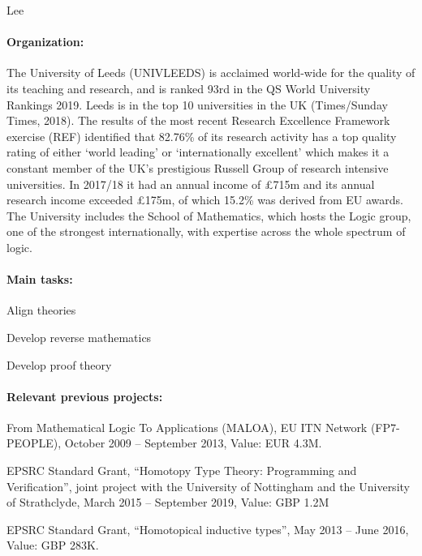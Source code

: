 \begin{sitedescription}{Lee}

\paragraph{Organization:} The University of Leeds (UNIVLEEDS) is acclaimed world-wide for the quality of its teaching and research, and is ranked 93rd in the QS World University Rankings 2019. Leeds is in the top 10 universities in the UK (Times/Sunday Times, 2018). The results of the most recent Research Excellence Framework exercise (REF) identified that 82.76\% 
of its research activity has a top quality rating of either `world leading' or `internationally excellent' which makes it a constant member of the UK's prestigious Russell Group of research intensive universities. 
In 2017/18 it had an annual income of \pounds 715m and its annual research income exceeded \pounds 175m, of which 15.2\% was derived from EU awards. The University includes the School of Mathematics,
which hosts the Logic group, one of the strongest internationally, with expertise across the whole
spectrum of logic. 




\paragraph{Main tasks:}

\begin{compactitem}
\item Align theories
\item Develop reverse mathematics
\item Develop proof theory
\end{compactitem}




\paragraph{Relevant previous projects:}

\begin{compactitem}
\item From Mathematical Logic To Applications (MALOA), EU ITN Network (FP7-PEOPLE), October 2009 -- September 2013, Value: EUR 4.3M.
\item EPSRC Standard Grant, ``Homotopy Type Theory: Programming and Verification'', joint project with the University of Nottingham and the University of Strathclyde, March 2015 -- September 2019, Value: GBP 1.2M
\item EPSRC Standard Grant, ``Homotopical inductive types'', May 2013 -- June 2016, Value: GBP 283K.
\end{compactitem}


\end{sitedescription}
